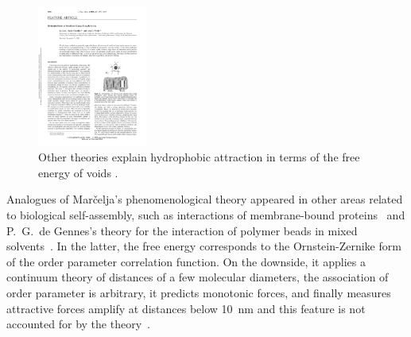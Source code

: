 \begin{figure}
  \vspace{-25pt}
  \centering
  \includegraphics[width=0.32\textwidth]{figures/Background/ChandlerWeeks.pdf}
  \vspace{-20pt}
  \caption{\label{fig:chandler_weeks} Other theories explain hydrophobic
  attraction in terms of the free energy of voids \cite{Lum1999}.}
\end{figure}
Analogues of Mar\v{c}elja's phenomenological theory appeared in other
areas related to biological self-assembly, such as interactions of
membrane-bound proteins~\cite{KoNa15, Nagle17, KUZMIN2005} and P.~G.~de
Gennes's theory for the interaction of polymer beads in mixed
solvents~\cite{deGe76}. In the latter, the free energy corresponds to
the Ornstein-Zernike form of the order parameter correlation function.
On the downside, it applies a continuum theory of distances of a few
molecular diameters, the association of order parameter is arbitrary, it
predicts monotonic forces, and finally measures attractive forces
amplify at distances below 10~nm and this feature is not accounted for
by the theory~\cite{Ni80}. 


